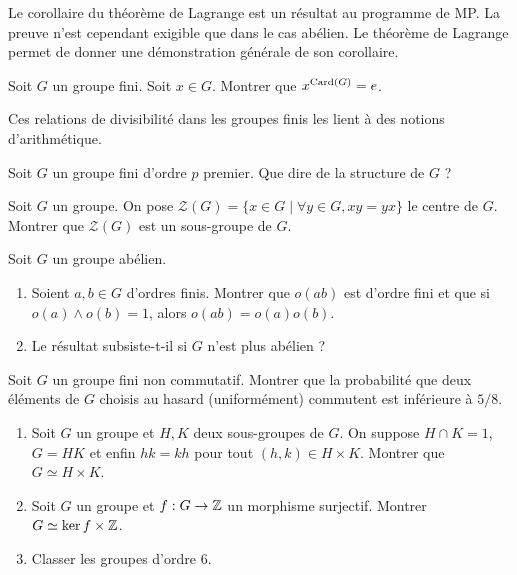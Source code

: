 \documentclass[12pt,a4paper]{exo_book}
\begin{document}
Le corollaire du théorème de Lagrange est un résultat au programme de MP. La preuve n'est cependant exigible que dans le cas abélien. Le théorème de Lagrange permet de donner une démonstration générale de son corollaire.

\begin{exo}
 Soit $G$ un groupe fini. Soit $x \in G$. Montrer que $x ^ {\operatorname{Card} (G)} = e$.
\end{exo}

Ces relations de divisibilité dans les groupes finis les lient à des notions d'arithmétique.

\begin{exo}
    Soit $G$ un groupe fini d'ordre $p$ premier. Que dire de la structure de $G$ ?
\end{exo}

\begin{exo}
    Soit $G$ un groupe. On pose $\mathcal{Z}(G) = \{x \in G \mid \forall y\in G, xy=yx\}$ le centre de $G$. Montrer que $\mathcal{Z}(G)$ est un sous-groupe de $G$.
\end{exo}

\begin{exo}
    Soit $G$ un groupe abélien.
    \begin{enumerate}
        \item Soient $a,b \in G$ d'ordres finis. Montrer que $o(ab)$ est d'ordre fini et que si $o(a) \wedge o(b) = 1$, alors $o(ab)=o(a)o(b)$.
        \item Le résultat subsiste-t-il si $G$ n'est plus abélien ?
    \end{enumerate}
\end{exo}

\begin{exo}
    Soit $G$ un groupe fini non commutatif. Montrer que la probabilité que deux éléments de $G$ choisis au hasard (uniformément) commutent est inférieure à $5/8$.
\end{exo}

\begin{exo}
    \begin{enumerate}
        \item Soit $G$ un groupe et $H, K$ deux sous-groupes de $G$. On suppose $H\cap K = 1$, $G = HK$ et enfin $hk = kh$ pour tout $(h,k)\in H\times K$. Montrer que $G\simeq H\times K$.
        \item Soit $G$ un groupe et $f : G\to \mathbb{Z}$ un morphisme surjectif. Montrer $G \simeq \ker f \times \mathbb{Z}$.
        \item Classer les groupes d'ordre $6$.
    \end{enumerate}
\end{exo}
\end{document}
